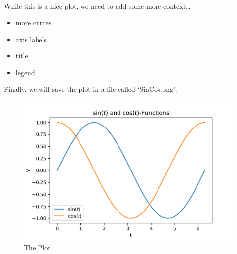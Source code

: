 \documentclass[11pt,a4paper, d]{scrartcl}
\providecommand{\tightlist}{%
      \setlength{\itemsep}{0pt}\setlength{\parskip}{0pt}}
\begin{document}
    \begin{center}
    \end{center}
    { \hspace*{\fill} \\}
    
    While this is a nice plot, we need to add some more context\ldots{}

\begin{itemize}
\tightlist
\item
  more curces
\item
  axis labels
\item
  title
\item
  legend
\end{itemize}

Finally, we will save the plot in a file called `SinCos.png':

\begin{figure}
\centering
\includegraphics{SinCos.png}
\caption{The Plot}
\end{figure}
\end{document}
